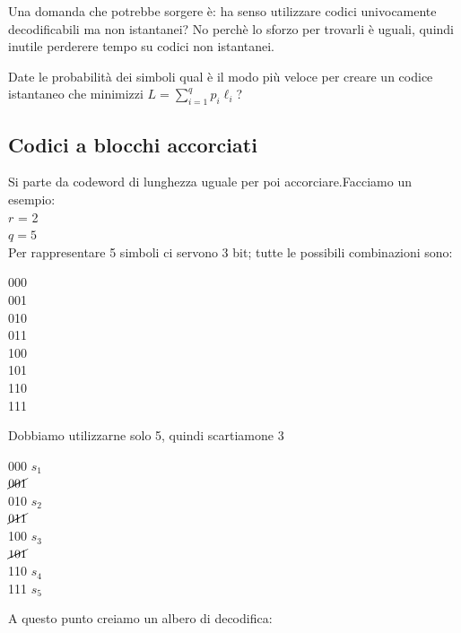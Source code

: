 Una domanda che potrebbe sorgere è: ha senso utilizzare codici univocamente decodificabili ma non istantanei? No perchè lo sforzo per trovarli è uguali, quindi inutile perderere tempo su codici non istantanei.

Date le probabilità dei simboli qual è il modo più veloce per creare un codice istantaneo che minimizzi $L=\sum_{i=1}^qp_i\ell_i$?

\newpage
\subsection*{Codici a blocchi accorciati}
Si parte da codeword di lunghezza uguale per poi accorciare.Facciamo un esempio:\\
$r$ = 2\\
$q=5$\\
Per rappresentare 5 simboli ci servono 3 bit; tutte le possibili combinazioni sono:
\begin{center}
	000\\001\\010\\011\\100\\101\\110\\111
\end{center}
Dobbiamo utilizzarne solo 5, quindi scartiamone 3
\begin{center}
	000 $s_1$\\$\cancel{001}$\\010 $s_2$\\$\cancel{011}$\\100 $s_3$\\$\cancel{101}$\\110 $s_4$\\111 $s_5$
\end{center}

A questo punto creiamo un albero di decodifica:

